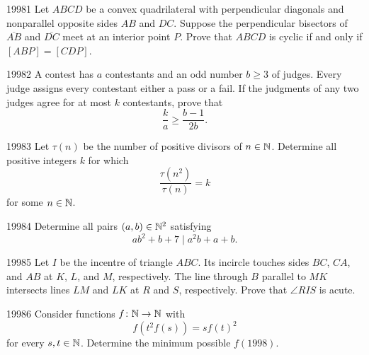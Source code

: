 
\begin{problem}{1998}{1}
Let $ABCD$ be a convex quadrilateral with perpendicular diagonals and nonparallel opposite sides $AB$ and $DC$. Suppose the perpendicular bisectors of $\overline{AB}$ and $\overline{DC}$ meet at an interior point $P$. Prove that $ABCD$ is cyclic if and only if $[ABP]=[CDP]$.
\end{problem}

\begin{problem}{1998}{2}
A contest has $a$ contestants and an odd number $b\geq3$ of judges. Every judge assigns every contestant either a pass or a fail. If the judgments of any two judges agree for at most $k$ contestants, prove that
\[
    \frac ka\geq\frac{b-1}{2b}.
\]
\end{problem}

\begin{problem}{1998}{3}
Let $\tau(n)$ be the number of positive divisors of $n\in\mathbb{N}$. Determine all positive integers $k$ for which
\[
    \frac{\tau(n^2)}{\tau(n)}=k
\]
for some $n\in\mathbb{N}$.
\end{problem}

\begin{problem}{1998}{4}
Determine all pairs $(a, b)\in\mathbb{N}^2$ satisfying
\[
    ab^2+b+7\mid a^2b+a+b.
\]
\end{problem}

\begin{problem}{1998}{5}
Let $I$ be the incentre of triangle $ABC$. Its incircle touches sides $BC$, $CA$, and $AB$ at $K$, $L$, and $M$, respectively. The line through $B$ parallel to $MK$ intersects lines $LM$ and $LK$ at $R$ and $S$, respectively. Prove that $\angle RIS$ is acute.
\end{problem}

\begin{problem}{1998}{6}
Consider functions $f\colon\mathbb{N}\to\mathbb{N}$ with
\[
    f(t^2f(s))=sf(t)^2
\]
for every $s, t\in\mathbb{N}$. Determine the minimum possible $f(1998)$.
\end{problem}
